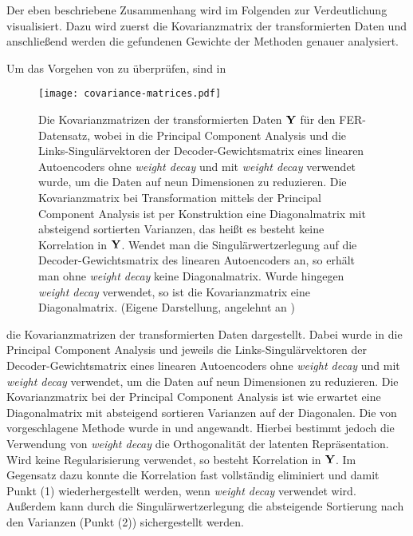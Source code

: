 Der eben beschriebene Zusammenhang wird im Folgenden zur Verdeutlichung visualisiert. Dazu wird
zuerst die Kovarianzmatrix der transformierten Daten und anschließend werden die gefundenen
Gewichte der Methoden genauer analysiert.

Um das Vorgehen von \textcite{Plaut.2018} zu überprüfen, sind in 
\begin{figure}[ht]
	\centering
	\texttt{[image: covariance-matrices.pdf]}
	\caption[Kovarianzmatrizen der transformierten Daten $\mat{Y}$ für den FER-Datensatz von drei Methoden]{Die Kovarianzmatrizen der transformierten Daten $\mat{Y}$ für den FER-Datensatz, wobei in \captiona die Principal Component Analysis und die Links-Singulärvektoren der Decoder-Gewichtsmatrix eines linearen Autoencoders \captionb ohne \textit{weight decay} und \captionc mit \textit{weight decay} verwendet wurde, um die Daten auf neun Dimensionen zu reduzieren. Die Kovarianzmatrix bei Transformation mittels der Principal Component Analysis ist per Konstruktion eine Diagonalmatrix mit absteigend sortierten Varianzen, das heißt es besteht keine Korrelation in $\mat{Y}$. Wendet man die Singulärwertzerlegung auf die Decoder-Gewichtsmatrix des linearen Autoencoders an, so erhält man ohne \textit{weight decay} keine Diagonalmatrix. Wurde hingegen \textit{weight decay} verwendet, so ist die Kovarianzmatrix eine Diagonalmatrix. (Eigene Darstellung, angelehnt an \textcite[5]{Plaut.2018})}
	\label{fig:Kovarianzmatrizen}
\end{figure}
die Kovarianzmatrizen der transformierten Daten dargestellt. Dabei wurde in \captiona die Principal Component Analysis und jeweils die Links-Singulärvektoren der Decoder-Gewichtsmatrix eines linearen Autoencoders \captionb ohne \textit{weight decay} und \captionc mit \textit{weight decay} verwendet, um die Daten auf neun Dimensionen zu reduzieren. Die Kovarianzmatrix bei der Principal Component Analysis ist wie erwartet eine Diagonalmatrix mit absteigend sortieren Varianzen auf der Diagonalen. Die von \textcite{Plaut.2018} vorgeschlagene Methode wurde in \captionb und \captionc angewandt. Hierbei bestimmt jedoch die Verwendung von \textit{weight decay} die Orthogonalität der latenten Repräsentation. Wird keine Regularisierung verwendet, so besteht Korrelation in $\mat{Y}$. Im Gegensatz dazu konnte die Korrelation fast vollständig eliminiert und damit Punkt (1) wiederhergestellt werden, wenn \textit{weight decay} verwendet wird. Außerdem kann durch die Singulärwertzerlegung die absteigende Sortierung nach den Varianzen (Punkt (2)) sichergestellt werden.

